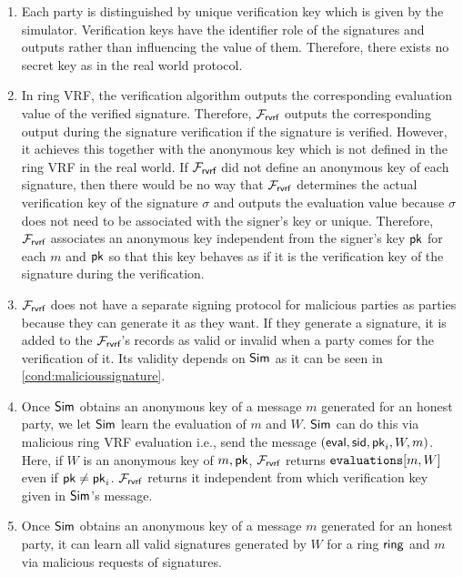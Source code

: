 \begin{enumerate}[label={{R-} }{{\arabic*}}, start = 1]
	\item Each party is distinguished by unique verification key which is given by the simulator. Verification keys have the identifier role of  the signatures and outputs rather than  influencing the value of them. Therefore, there exists no secret key as in the real world protocol.
	
	\item In ring VRF, the verification algorithm outputs the corresponding evaluation value of the verified signature. Therefore, $ \mathcal{F}_{\textsf{rvrf}} $  outputs the corresponding output during the signature verification if the signature is verified. However, it achieves this together with the anonymous key which is not defined in the ring VRF in the real world.  If $ \mathcal{F}_{\textsf{rvrf}} $ did not define an anonymous key of each signature, then there would be no way that $ \mathcal{F}_{\textsf{rvrf}} $ determines the actual verification key of the signature $ \sigma $ and outputs the evaluation value because $ \sigma $ does not need to be associated with the signer's key or unique. Therefore, $ \mathcal{F}_{\textsf{rvrf}} $ associates an anonymous key independent from the signer's key $ \mathsf{pk} $ for each $ m $ and $ \mathsf{pk} $ so that this key behaves as if it is the verification key of the signature during the verification.
	
	\item $ \mathcal{F}_{\textsf{rvrf}} $ does not have a separate signing protocol for malicious parties as parties because they can generate it as they want. If they generate a signature, it is added to the $ \mathcal{F}_{\textsf{rvrf}} $'s records as valid or invalid when a party comes for the verification of it.  Its validity depends on $ \mathsf{Sim} $ as it can be seen in \ref{cond:malicioussignature}. 
	
	\item Once $ \mathsf{Sim} $ obtains an anonymous key of a message $ m $ generated for an honest party, we let $ \mathsf{Sim} $ learn the  evaluation of  $ m $ and  $ W $. $ \mathsf{Sim} $ can do this via malicious ring VRF evaluation i.e., send the message $ (\mathsf{eval}, \textsf{sid}, \mathsf{pk}_i,W,m) $. Here, if $ W $ is an anonymous key of $ m, \mathsf{pk}  $, $ \mathcal{F}_{\textsf{rvrf}} $ returns $ \texttt{evaluations}[m, W] $ even if $ \mathsf{pk} \neq \mathsf{pk}_i $. $ \mathcal{F}_{\textsf{rvrf}} $ returns it independent from which verification key given in $ \mathsf{Sim} $'s message. 
	
	\item Once $ \mathsf{Sim} $ obtains an anonymous key of a message $ m $ generated for an honest party, it can learn all valid signatures generated by $ W $ for a ring $ \mathsf{ring} $ and $ m $ via malicious requests of signatures.
	
\end{enumerate}
